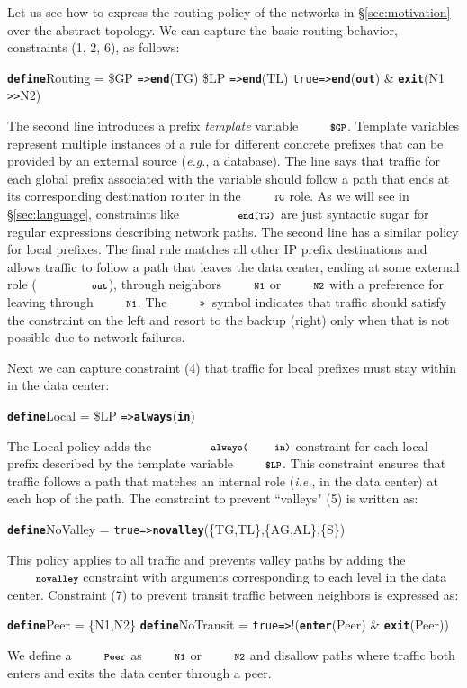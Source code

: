 \documentclass[numbers, 10pt, preprint]{sigplanconf}
\newcommand{\EG}{\emph{e.g.}}
\newcommand{\IE}{\emph{i.e.}}
\newcommand{\CD}[1]{\texttt{\small #1}}
\newcommand{\KW}[1]{\texttt{\small\bfseries{#1}}}
\newcommand{\True}{\CD{true}}
\newcommand{\Define}{\KW{define}}
\newcommand{\Prefer}{\texttt{>>}}
\newcommand{\Path}{\texttt{=>}}
\newcommand{\In}{\KW{in}}
\newcommand{\Out}{\KW{out}}
\newcommand{\Exit}{\KW{exit}}
\newcommand{\End}{\KW{end}}
\newcommand{\Enter}{\KW{enter}}
\newcommand{\Always}{\KW{always}}
\newcommand{\Novalley}{\KW{novalley}}
\begin{document}
Let us see how to express the routing policy of the networks in \S\ref{sec:motivation} over the abstract topology. We can capture the basic routing behavior, constraints (1, 2, 6),  as follows:
%
\begin{code}
\Define Routing =
    \$GP  \Path \End(TG)
    \$LP  \Path \End(TL)
    \True \Path \End(\Out) & \Exit(N1 \Prefer N2)
\end{code}
\noindent%

The second line introduces a prefix \emph{template} variable $\CD{\$GP}$. Template variables represent multiple instances of a rule for different concrete prefixes that can be provided by an external source (\EG, a database). The line says that traffic for each global prefix associated with the variable should follow a path that ends at its corresponding destination router in the $\CD{TG}$ role. As we will see in \S\ref{sec:language}, constraints like $\CD{\End(TG)}$ are just syntactic sugar for regular expressions describing network paths. The second line has a similar policy for local prefixes.
%
The final rule matches all other IP prefix destinations and allows traffic to follow a path that leaves the data center, ending at some external role ($\CD{\Out}$), through neighbors $\CD{N1}$ or $\CD{N2}$ with a preference for leaving through $\CD{N1}$. The $\CD{\Prefer}$~symbol indicates that traffic should satisfy the constraint on the left and resort to the backup (right) only when that is not possible due to network failures.%

Next we can capture constraint (4) that traffic for local prefixes must stay within in the data center:
%
\begin{code}
\Define Local =
    \$LP \Path \Always(\In)
\end{code}
\noindent%
%
The Local policy adds the $\CD{\Always(\In)}$ constraint for each local prefix described by the template variable $\CD{\$LP}$. This constraint ensures that traffic follows a path that matches an internal role (\IE, in the data center) at each hop of the path.
%
The constraint to prevent ``valleys" (5) is written as:
%
\begin{code}
\Define NoValley =
    \True \Path \Novalley(\{TG,TL\},\{AG,AL\},\{S\})
\end{code}
\noindent%
%
This policy applies to all traffic and prevents valley paths by adding the $\Novalley$ constraint with arguments corresponding to each level in the data center.
%
Constraint (7) to prevent transit traffic between neighbors is expressed as:
%
\begin{code}
\Define Peer = \{N1,N2\}
\Define NoTransit =
    \True \Path !(\Enter(Peer) & \Exit(Peer))
\end{code}
\noindent%
%
We define a $\CD{Peer}$ as $\CD{N1}$ or $\CD{N2}$ and disallow paths where traffic both enters and exits the data center through a peer.
\end{document}
